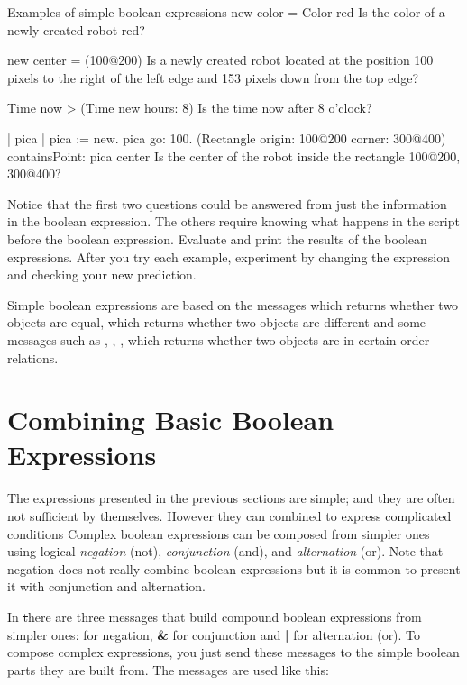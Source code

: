 \begin{scriptwithtitle}{Examples of simple boolean expressions}\label{scr:simplbool}
\Turtle new color = Color red
\textrm{Is the color of a newly created robot red?}

\Turtle new center = (100@200)
\textrm{Is a newly created robot located at the position 
100 pixels to the right of the left edge and 153 pixels down from the top edge?}

Time now > (Time new hours: 8)
\textrm{Is the time now after 8 o'clock?}

| pica |
pica := \Turtle new. 
pica go: 100.
(Rectangle origin: 100@200 corner: 300@400) 
    containsPoint: pica center
\textrm{Is the center of the robot inside  the rectangle 100@200, 300@400?}
\end{scriptwithtitle}

Notice that the first two questions could be answered from just the information in the boolean expression. The others require knowing what happens in the script before the boolean expression. Evaluate and print the results of the boolean expressions. After you try each example, experiment by changing the expression and checking your new prediction. 

Simple boolean expressions are based on the messages \ct{=} which returns whether two objects are equal, \ct{$\sim=$} which returns whether two objects are different and some messages such as \ct{>}, \ct{<=}, \ct{<}, \ct{>=} which returns whether two objects are in certain order relations. 


\section{Combining Basic Boolean Expressions}
The expressions presented in the previous sections are simple;  and they are often not sufficient by themselves. However they can combined to express complicated conditions
Complex boolean expressions can be composed from simpler ones using logical \emph{negation}  (not), \emph{conjunction}  (and), and  \emph{alternation} (or). Note that negation does not really combine boolean expressions but it is common to present it with conjunction and alternation. 

In \st there are three messages that build compound boolean expressions from simpler ones:  for negation, \textbf{\&} for conjunction and  \textbf{|} for alternation (or).  
To compose complex expressions, you just  send these messages to the simple boolean parts they are built from. The messages are used like this:

